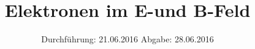 

\subject{V501-2}
\title{Elektronen im E-und B-Feld}
\date{
  Durchführung: 21.06.2016
  \hspace{3em}
  Abgabe: 28.06.2016
}



\maketitle
\thispagestyle{empty}
\tableofcontents
\newpage


%
%
%

%

\printbibliography


